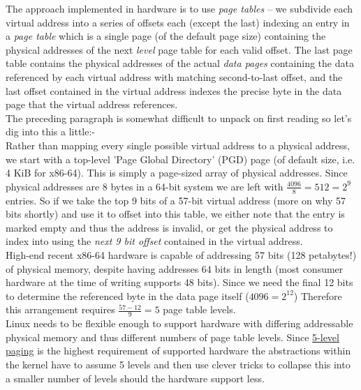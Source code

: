 The approach implemented in hardware is to use \emph{page tables} -- we
subdivide each virtual address into a series of offsets each (except the last)
indexing an entry in a \emph{page table} which is a single page (of the default
page size) containing the physical addresses of the next \emph{level} page table
for each valid offset. The last page table contains the physical addresses of
the actual \emph{data pages} containing the data referenced by each virtual
address with matching second-to-last offset, and the last offset contained in
the virtual address indexes the precise byte in the data page that the virtual
address references.\\

The preceding paragraph is somewhat difficult to unpack on first reading so
let's dig into this a little:-\\

Rather than mapping every single possible virtual address to a physical address,
we start with a top-level 'Page Global Directory' (PGD) page (of default size,
i.e. 4 KiB for x86-64). This is simply a page-sized array of physical
addresses. Since physical addresses are 8 bytes in a 64-bit system we are left
with $\frac{4096}{8} = 512 = 2^9$ entries. So if we take the top 9 bits of a
57-bit virtual address (more on why 57 bits shortly) and use it to offset into
this table, we either note that the entry is marked empty and thus the address
is invalid, or get the physical address to index into using the \emph{next 9 bit
offset} contained in the virtual address.\\

High-end recent x86-64 hardware is capable of addressing 57 bits (128
petabytes!) of physical memory, despite having addresses 64 bits in length (most
consumer hardware at the time of writing supports 48 bits). Since we need the final
12 bits to determine the referenced byte in the data page itself ($4096 =
2^{12}$) Therefore this arrangement requires $\frac{57 - 12}{9} = 5$ page table
levels.\\

Linux needs to be flexible enough to support hardware with differing addressable
physical memory and thus different numbers of page table levels. Since
\href{https://en.wikipedia.org/wiki/Intel_5-level_paging}{5-level paging} is the
highest requirement of supported hardware the abstractions within the kernel
have to assume 5 levels and then use clever tricks to collapse this into a
smaller number of levels should the hardware support less.\\

